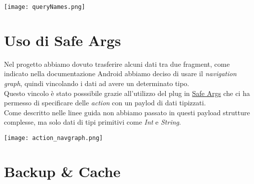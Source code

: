 \documentclass[../Assignment-3-LPSMT.tex]{subfiles}
\begin{document}
\begin{center}
  \texttt{[image: queryNames.png]}
\end{center}

\section{Uso di Safe Args}

Nel progetto abbiamo dovuto trasferire alcuni dati tra due fragment, come indicato nella documentazione Android abbiamo deciso di usare il \emph{navigation graph}, quindi vincolando i dati ad avere un determinato tipo.\\
Questo vincolo è stato posssibile grazie all'utilizzo del plug in \href{https://developer.android.com/guide/navigation/use-graph/pass-data#Safe-args}{Safe Args} che ci ha permesso di specificare delle \emph{action} con un paylod di dati tipizzati.\\
Come descritto nelle linee guida non abbiamo passato in questi payload strutture complesse, ma solo dati di tipi primitivi come \emph{Int} e \emph{String}.

\begin{center}
  \texttt{[image: action\_navgraph.png]}
\end{center}

\section{Backup \& Cache}
\end{document}
